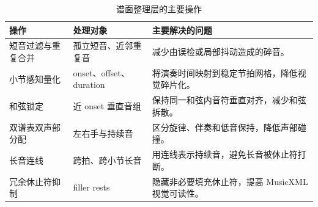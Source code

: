 \begin{table}[H]
\centering
\caption{谱面整理层的主要操作}
\label{tab:score_operations}
\small
\begin{tabularx}{\linewidth}{llX}
\toprule
操作 & 处理对象 & 主要解决的问题 \\
\midrule
短音过滤与重复合并 & 孤立短音、近邻重复音 & 减少由误检或局部抖动造成的碎音。 \\
小节感知量化 & onset、offset、duration & 将演奏时间映射到稳定节拍网格，降低视觉碎片化。 \\
和弦锁定 & 近 onset 垂直音组 & 保持同一和弦内音符垂直对齐，减少和弦拆散。 \\
双谱表双声部分配 & 左右手与持续音 & 区分旋律、伴奏和低音保持，降低声部碰撞。 \\
长音连线 & 跨拍、跨小节长音 & 用连线表示持续音，避免长音被休止符打断。 \\
冗余休止符抑制 & filler rests & 隐藏非必要填充休止符，提高 MusicXML 视觉可读性。 \\
\bottomrule
\end{tabularx}
\end{table}
